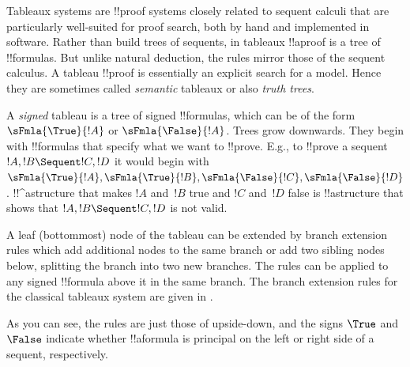 \documentclass[../../../include/open-logic-section]{subfiles}
\begin{document}


Tableaux systems are !!{proof} systems closely related to sequent
calculi that are particularly well-suited for proof search, both by
hand and implemented in software. Rather than build trees of sequents,
in tableaux !!a{proof} is a tree of !!{formula}s. But unlike natural
deduction, the rules mirror those of the sequent calculus. A tableau
!!{proof} is essentially an explicit search for a model. Hence they
are sometimes called \emph{semantic} tableaux or also \emph{truth
trees}.

A \emph{signed} tableau is a tree of signed !!{formula}s, which can be
of the form $\sFmla{\True}{!A}$ or $\sFmla{\False}{!A}$. Trees grow
downwards. They begin with !!{formula}s that specify what we want to
!!{prove}. E.g., to !!{prove} a sequent $!A, !B \Sequent !C, !D$ it
would begin with $\sFmla{\True}{!A}, \sFmla{\True}{!B},
\sFmla{\False}{!C}, \sFmla{\False}{!D}$. !!^a{structure} that makes
$!A$ and~$!B$ true and $!C$ and~$!D$ false is !!a{structure} that
shows that $!A, !B \Sequent !C, !D$ is not valid. 

A leaf (bottommost) node of the tableau can be extended by branch
extension rules which add additional nodes to the same branch or add
two sibling nodes below, splitting the branch into two new branches.
The rules can be applied to any signed !!{formula} above it in the
same branch. The branch extension rules for the classical tableaux
system  are given in .



As you can see, the rules are just those of  upside-down, and
the signs $\True$ and $\False$ indicate whether !!a{formula} is
principal on the left or right side of a sequent, respectively.
\end{document}
